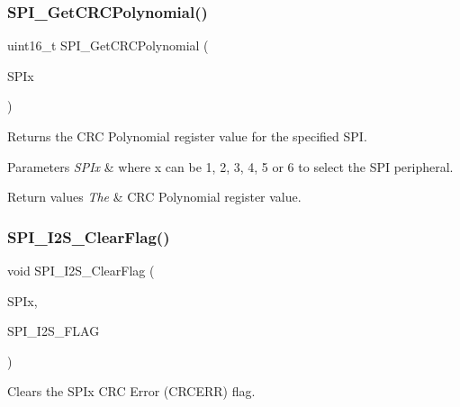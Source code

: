 \subsubsection{\texorpdfstring{S\+P\+I\+\_\+\+Get\+C\+R\+C\+Polynomial()}{SPI\_GetCRCPolynomial()}}
{\footnotesize\ttfamily uint16\+\_\+t S\+P\+I\+\_\+\+Get\+C\+R\+C\+Polynomial (\begin{DoxyParamCaption}\item[{S\+P\+I\+\_\+\+Type\+Def $\ast$}]{S\+P\+Ix }\end{DoxyParamCaption})}



Returns the C\+RC Polynomial register value for the specified S\+PI. 


\begin{DoxyParams}{Parameters}
{\em S\+P\+Ix} & where x can be 1, 2, 3, 4, 5 or 6 to select the S\+PI peripheral. \\
\hline
\end{DoxyParams}

\begin{DoxyRetVals}{Return values}
{\em The} & C\+RC Polynomial register value. \\
\hline
\end{DoxyRetVals}
\mbox{\label{group___s_p_i_ga3aabd9e2437e213056c0ed9bdfa1a724}} 
\subsubsection{\texorpdfstring{S\+P\+I\+\_\+\+I2\+S\+\_\+\+Clear\+Flag()}{SPI\_I2S\_ClearFlag()}}
{\footnotesize\ttfamily void S\+P\+I\+\_\+\+I2\+S\+\_\+\+Clear\+Flag (\begin{DoxyParamCaption}\item[{S\+P\+I\+\_\+\+Type\+Def $\ast$}]{S\+P\+Ix,  }\item[{uint16\+\_\+t}]{S\+P\+I\+\_\+\+I2\+S\+\_\+\+F\+L\+AG }\end{DoxyParamCaption})}



Clears the S\+P\+Ix C\+RC Error (C\+R\+C\+E\+RR) flag. 


